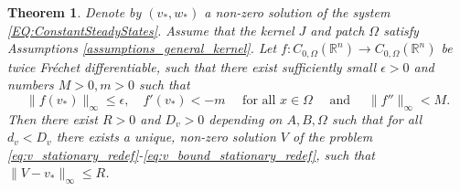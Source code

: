 \documentclass[11pt, a4paper]{article}
\theoremstyle{break}
\newtheorem{thm}{Theorem}[section]
\theoremstyle{break}
\theoremstyle{break}
\theoremstyle{break}
\theoremstyle{break}
\theoremstyle{break}
\theoremstyle{break}
\theoremstyle{break}
\theoremstyle{break}
\begin{document}
\begin{thm}
    \label{thm:Stationary-Solutions-Existence}
    Denote by $(v_*, w_*)$ a non-zero solution of the system \eqref{EQ:ConstantSteadyStates}. Assume that the kernel $J$ and patch $\Omega$ satisfy Assumptions \ref{assumptions_general_kernel}. Let $f : C_{0, \Omega}(\mathbb{R}^n) \rightarrow C_{0, \Omega}(\mathbb{R}^n)$ be twice Fr\'echet differentiable, such that there exist sufficiently small $\epsilon > 0$ and numbers $M > 0, m > 0$ such that
    \begin{equation}
        \|f(v_*)\|_\infty \leq \epsilon, 
        \quad
        f'(v_*) < -m
        \quad
        \text{ for all }
        x \in \Omega
        \quad
        \text{ and }
        \quad
        \|f''\|_\infty < M.
    \end{equation}
    Then there exist $R > 0$ and $D_v > 0$ depending on $A, B, \Omega$ such that for all $d_v < D_v$ there exists a unique, non-zero solution $V$ of the problem \eqref{eq:v_stationary_redef}-\eqref{eq:v_bound_stationary_redef}, such that $\|V-v_*\|_\infty \leq R$.
\end{thm}
\end{document}
